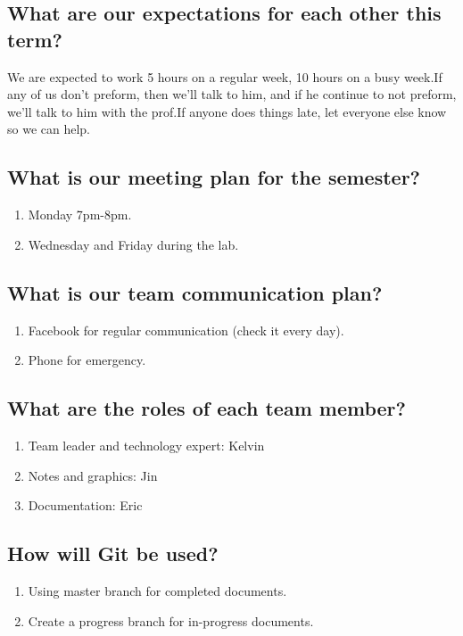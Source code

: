 \documentclass[11pt]{meetingmins}
\begin{document}
	\subsection{What are our expectations for each other this term?}
		We are expected to work 5 hours on a regular week, 10 hours on a busy week.If 
any of us don't preform, then we'll talk to him, and if he continue to not 
preform, we'll talk to him with the prof.If anyone does things late, let 
everyone else know so we can help.
		

	\subsection{What is our meeting plan for the semester?}
		\begin{enumerate}
			\item{Monday 7pm-8pm. }
			\item{Wednesday and Friday during the lab.}
		\end{enumerate}
		
	\subsection{What is our team communication plan?}
		\begin{enumerate}
			\item{Facebook for regular communication (check it every day).}
			\item{Phone for emergency.}
		\end{enumerate}
		
	\subsection{What are the roles of each team member?}
		\begin{enumerate}
			\item{Team leader and technology expert: Kelvin}
			\item{Notes and graphics: Jin}
			\item{Documentation: Eric}
		\end{enumerate}

	\subsection{How will Git be used?}
		\begin{enumerate}
			\item{Using master branch for completed documents.}
			\item{Create a progress branch for in-progress documents.}
		\end{enumerate}
		
\end{document}
